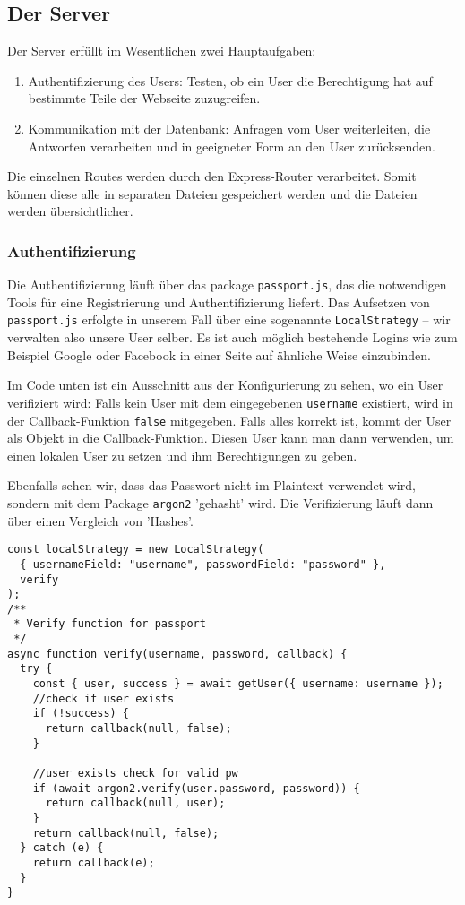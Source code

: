 \subsection{Der Server}

Der Server erfüllt im Wesentlichen zwei Hauptaufgaben:
\begin{enumerate}
    \item Authentifizierung des Users: Testen, ob ein User die Berechtigung hat auf bestimmte Teile der Webseite zuzugreifen.
    \item Kommunikation mit der Datenbank: Anfragen vom User weiterleiten, die Antworten verarbeiten und in geeigneter Form an den User zurücksenden.
\end{enumerate}

Die einzelnen Routes werden durch den Express-Router verarbeitet. Somit können diese alle in separaten Dateien gespeichert werden und die Dateien werden übersichtlicher.

\subsubsection{Authentifizierung}
Die Authentifizierung läuft über das package \verb|passport.js|, das die notwendigen Tools für eine Registrierung und Authentifizierung liefert. Das Aufsetzen von \verb|passport.js| erfolgte in unserem Fall über eine sogenannte \verb|LocalStrategy| -- wir verwalten also unsere User selber. Es ist auch möglich bestehende Logins wie zum Beispiel Google oder Facebook in einer Seite auf ähnliche Weise einzubinden. 

Im Code unten ist ein Ausschnitt aus der Konfigurierung zu sehen, wo ein User verifiziert wird: Falls kein User mit dem eingegebenen \verb|username| existiert, wird in der Callback-Funktion \verb|false| mitgegeben. Falls alles korrekt ist, kommt der User als Objekt in die Callback-Funktion. Diesen User kann man dann verwenden, um einen lokalen User zu setzen und ihm Berechtigungen zu geben.

Ebenfalls sehen wir, dass das Passwort nicht im Plaintext verwendet wird, sondern mit dem Package \verb|argon2| 'gehasht' wird. Die Verifizierung läuft dann über einen Vergleich von 'Hashes'. 

 \newpage

\begin{lstlisting}
const localStrategy = new LocalStrategy(
  { usernameField: "username", passwordField: "password" },
  verify
);
/**
 * Verify function for passport
 */
async function verify(username, password, callback) {
  try {
    const { user, success } = await getUser({ username: username });
    //check if user exists
    if (!success) {
      return callback(null, false);
    }

    //user exists check for valid pw
    if (await argon2.verify(user.password, password)) {
      return callback(null, user);
    }
    return callback(null, false);
  } catch (e) {
    return callback(e);
  }
}
\end{lstlisting}

